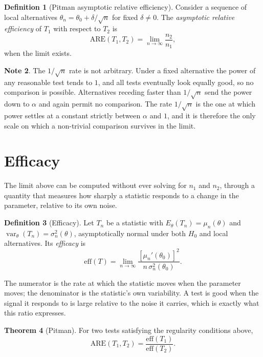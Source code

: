 \documentclass[12pt,a4paper]{report}
\theoremstyle{definition}
\newtheorem{thm}{Theorem}[section]
\newtheorem{defn}[thm]{Definition}
\newtheorem{note}[thm]{Note}
\theoremstyle{plain}
\begin{document}
\begin{defn}[Pitman asymptotic relative efficiency]
Consider a sequence of local alternatives $\theta_n = \theta_0 + \delta/\sqrt{n}$
for fixed $\delta \neq 0$. The \emph{asymptotic relative efficiency} of $T_1$
with respect to $T_2$ is
$$\mathrm{ARE}\left(T_1,T_2\right) = \lim_{n\to\infty}\frac{n_2}{n_1},$$
when the limit exists.
\end{defn}

\begin{note}
The $1/\sqrt{n}$ rate is not arbitrary. Under a fixed alternative the power of
any reasonable test tends to $1$, and all tests eventually look equally good, so
no comparison is possible. Alternatives receding faster than $1/\sqrt{n}$ send
the power down to $\alpha$ and again permit no comparison. The rate
$1/\sqrt{n}$ is the one at which power settles at a constant strictly between
$\alpha$ and $1$, and it is therefore the only scale on which a non-trivial
comparison survives in the limit.
\end{note}

\section{Efficacy}

The limit above can be computed without ever solving for $n_1$ and $n_2$,
through a quantity that measures how sharply a statistic responds to a change in
the parameter, relative to its own noise.

\begin{defn}[Efficacy]
Let $T_n$ be a statistic with $E_\theta(T_n) = \mu_n(\theta)$ and
$\operatorname{var}_\theta(T_n) = \sigma^2_n(\theta)$, asymptotically normal
under both $H_0$ and local alternatives. Its \emph{efficacy} is
$$\mathrm{eff}(T) = \lim_{n\to\infty}
\frac{\left[\mu_n'(\theta_0)\right]^{2}}{n\,\sigma^{2}_n(\theta_0)} .$$
\end{defn}

The numerator is the rate at which the statistic moves when the parameter moves;
the denominator is the statistic's own variability. A test is good when the
signal it responds to is large relative to the noise it carries, which is
exactly what this ratio expresses.

\begin{thm}[Pitman]
\label{thm:pitman}
For two tests satisfying the regularity conditions above,
$$\mathrm{ARE}\left(T_1,T_2\right)
= \frac{\mathrm{eff}(T_1)}{\mathrm{eff}(T_2)} .$$
\end{thm}
\end{document}
